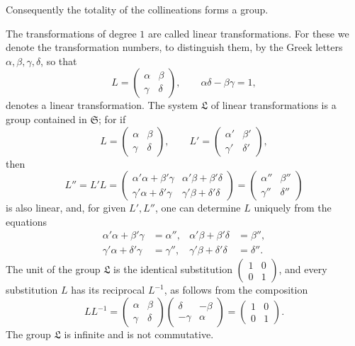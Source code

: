 \documentclass[11pt]{article}
\begin{document}
Consequently the totality of the collineations forms a group.

The transformations of degree $1$ are called linear transformations. For these we denote the transformation numbers, to distinguish them, by the Greek letters $\alpha,\beta,\gamma,\delta$, so that
\[
L=\begin{pmatrix}\alpha&\beta\\ \gamma&\delta\end{pmatrix},
\qquad \alpha\delta-\beta\gamma=1,
\]
denotes a linear transformation. The system $\mathfrak L$ of linear transformations is a group contained in $\mathfrak S$; for if
\[
L=\begin{pmatrix}\alpha&\beta\\ \gamma&\delta\end{pmatrix},
\qquad
L'=\begin{pmatrix}\alpha'&\beta'\\ \gamma'&\delta'\end{pmatrix},
\]
then
\[
L''=L'L=\begin{pmatrix}
\alpha'\alpha+\beta'\gamma&\alpha'\beta+\beta'\delta\\
\gamma'\alpha+\delta'\gamma&\gamma'\beta+\delta'\delta
\end{pmatrix}
=\begin{pmatrix}\alpha''&\beta''\\ \gamma''&\delta''\end{pmatrix}
\]
is also linear, and, for given $L',L''$, one can determine $L$ uniquely from the equations
\[
\begin{aligned}
\alpha'\alpha+\beta'\gamma&=\alpha'',&
\alpha'\beta+\beta'\delta&=\beta'',\\
\gamma'\alpha+\delta'\gamma&=\gamma'',&
\gamma'\beta+\delta'\delta&=\delta''.
\end{aligned}
\]
The unit of the group $\mathfrak L$ is the identical substitution $\begin{pmatrix}1&0\\0&1\end{pmatrix}$, and every substitution $L$ has its reciprocal $L^{-1}$, as follows from the composition
\[
LL^{-1}=\begin{pmatrix}\alpha&\beta\\\gamma&\delta\end{pmatrix}
\begin{pmatrix}\delta&-\beta\\-\gamma&\alpha\end{pmatrix}
=\begin{pmatrix}1&0\\0&1\end{pmatrix}.
\]
The group $\mathfrak L$ is infinite and is not commutative.
\end{document}
